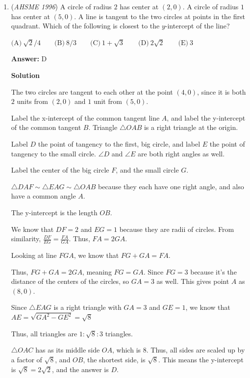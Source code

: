 \begin{enumerate}
 


	\item (\textit{AHSME 1996}) A circle of radius $2$ has center at $(2,0)$. A circle of radius $1$ has center at $(5,0)$. A line is tangent to the two circles at points in the first quadrant. Which of the following is closest to the $y$-intercept of the line?


 $\text{(A)}\ \sqrt{2}/4\qquad\text{(B)}\ 8/3\qquad\text{(C)}\ 1+\sqrt 3\qquad\text{(D)}\ 2\sqrt 2\qquad\text{(E)}\ 3$

 \textbf{Answer: }D



\textbf{Solution}

The two circles are tangent to each other at the point $(4,0)$, since it is both $2$ units from $(2,0)$ and $1$ unit from $(5,0)$.

 Label the x-intercept of the common tangent line $A$, and label the y-intercept of the common tangent $B$.  Triangle $\triangle OAB$ is a right triangle at the origin.

 Label $D$ the point of tangency to the first, big circle, and label $E$ the point of tangency to the small circle.  $\angle D$ and $\angle E$ are both right angles as well.

 Label the center of the big circle $F$, and the small circle $G$.

 $\triangle DAF  \sim \triangle EAG \sim \triangle OAB$ because they each have one right angle, and also have a common angle $A$.

 The y-intercept is the length $OB$.

 We know that $DF = 2$ and $EG = 1$ because they are radii of circles.  From similarity, $\frac{DF}{EG} = \frac{FA}{GA}$.  Thus, $FA = 2GA$.

 Looking at line $FGA$, we know that $FG + GA = FA$.

 Thus, $FG + GA = 2GA$, meaning $FG = GA$.  Since $FG = 3$ because it's the distance of the centers of the circles, so $GA = 3$ as well.  This gives point $A$ as $(8,0)$.

 Since $\triangle EAG$ is a right triangle with $GA = 3$ and $GE = 1$, we know that $AE = \sqrt{GA^2 - GE^2} = \sqrt{8}$

 Thus, all triangles are $1:\sqrt{8}:3$ triangles.

 $\triangle OAC$ has as its middle side $OA$, which is $8$.  Thus, all sides are scaled up by a factor of $\sqrt{8}$, and $OB$, the shortest side, is $\sqrt{8}$.  This means the y-intercept is $\sqrt{8} = 2\sqrt{2}$, and the answer is $\boxed{D}$.


\end{enumerate}
